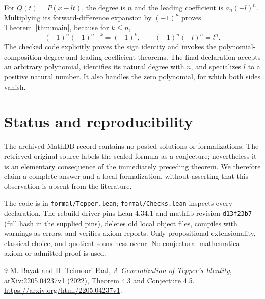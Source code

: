 \documentclass[11pt]{article}
\begin{document}
For $Q(t)=P(x-lt)$, the degree is $n$ and the leading coefficient is $a_n(-l)^n$. Multiplying its forward-difference expansion by $(-1)^n$ proves Theorem~\ref{thm:main}, because for $k\le n$,
\[
(-1)^n(-1)^{n-k}=(-1)^k,\qquad (-1)^n(-l)^n=l^n.
\]
The checked code explicitly proves the sign identity and invokes the polynomial-composition degree and leading-coefficient theorems. The final declaration accepts an arbitrary polynomial, identifies its natural degree with $n$, and specializes $l$ to a positive natural number. It also handles the zero polynomial, for which both sides vanish.
\section{Status and reproducibility}
The archived MathDB record contains no posted solutions or formalizations. The retrieved original source labels the scaled formula as a conjecture; nevertheless it is an elementary consequence of the immediately preceding theorem. We therefore claim a complete answer and a local formalization, without asserting that this observation is absent from the literature.

The code is in \texttt{formal/Tepper.lean}; \texttt{formal/Checks.lean} inspects every declaration. The rebuild driver pins Lean 4.34.1 and mathlib revision \texttt{d13f23b7} (full hash in the supplied pins), deletes old local object files, compiles with warnings as errors, and verifies axiom reports. Only propositional extensionality, classical choice, and quotient soundness occur. No conjectural mathematical axiom or admitted proof is used.
\begin{thebibliography}{9}
 M. Bayat and H. Teimoori Faal, \emph{A Generalization of Tepper's Identity}, arXiv:2205.04237v1 (2022), Theorem 4.3 and Conjecture 4.5. \url{https://arxiv.org/html/2205.04237v1}.
\end{thebibliography}
\end{document}
